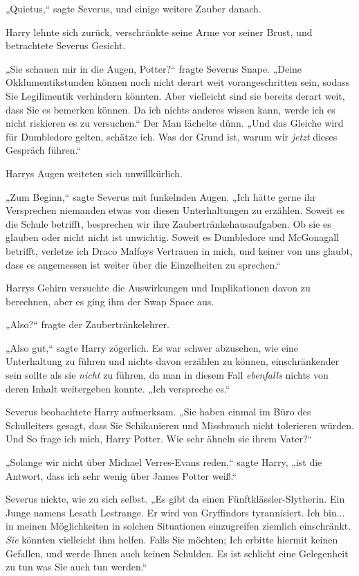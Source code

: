 {„Quietus,“ sagte Severus, und einige weitere Zauber danach.

Harry lehnte sich zurück, verschränkte seine Arme vor seiner Brust, und betrachtete Severus Gesicht.

„Sie schauen mir in die Augen, Potter?“ fragte Severus Snape. „Deine Okklumentikstunden können noch nicht derart weit vorangeschritten sein, sodass Sie Legilimentik verhindern könnten. Aber vielleicht sind sie bereits derart weit, dass Sie es bemerken können. Da ich nichts anderes wissen kann, werde ich es nicht riskieren es zu versuchen.“ Der Man lächelte dünn. „Und das Gleiche wird für Dumbledore gelten, schätze ich. Was der Grund ist, warum wir \emph{jetzt} dieses Gespräch führen.“

Harrys Augen weiteten sich unwillkürlich.

„Zum Beginn,“ sagte Severus mit funkelnden Augen. „Ich hätte gerne ihr Versprechen niemanden etwas von diesen Unterhaltungen zu erzählen. Soweit es die Schule betrifft, besprechen wir ihre Zaubertränkehausaufgaben. Ob sie es glauben oder nicht nicht ist unwichtig. Soweit es Dumbledore und McGonagall betrifft, verletze ich Draco Malfoys Vertrauen in mich, und keiner von uns glaubt, dass es angemessen ist weiter über die Einzelheiten zu sprechen.“

Harrys Gehirn versuchte die Auswirkungen und Implikationen davon zu berechnen, aber es ging ihm der Swap Space aus.

„Also?“ fragte der Zaubertränkelehrer.

„Also gut,“ sagte Harry zögerlich. Es war schwer abzusehen, wie eine Unterhaltung zu führen und nichts davon erzählen zu können, einschränkender sein sollte als sie \emph{nicht} zu führen, da man in diesem Fall \emph{ebenfalls} nichts von deren Inhalt weitergeben konnte. „Ich verspreche es.“

Severus beobachtete Harry aufmerksam. „Sie haben einmal im Büro des Schulleiters gesagt, dass Sie Schikanieren und Missbrauch nicht tolerieren würden. Und So frage ich mich, Harry Potter. Wie sehr ähneln sie ihrem Vater?“

„Solange wir nicht über Michael Verres-Evans reden,“ sagte Harry, „ist die Antwort, dass ich sehr wenig über James Potter weiß.“

Severus nickte, wie zu sich selbst. „Es gibt da einen Fünftklässler-Slytherin. Ein Junge namens Lesath Lestrange. Er wird von Gryffindors tyrannisiert. Ich bin... in meinen Möglichkeiten in solchen Situationen einzugreifen ziemlich einschränkt. \emph{Sie} könnten vielleicht ihm helfen. Falls Sie möchten; Ich erbitte hiermit keinen Gefallen, und werde Ihnen auch keinen Schulden. Es ist schlicht eine Gelegenheit zu tun was Sie auch tun werden.“

}
